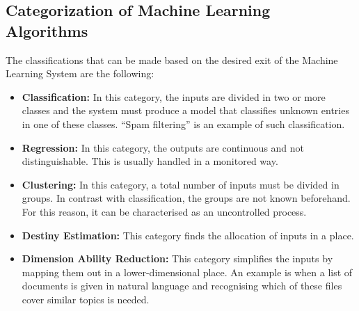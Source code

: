 \subsection{Categorization of Machine Learning Algorithms}\label{211_ref}
The classifications that can be made based on the desired exit of the Machine Learning System are the following:\\
\begin{itemize}

	\item \textbf{Classification:} In this category, the inputs are divided in two or more classes and the system must produce a model that classifies unknown entries in one of these classes. ``Spam filtering'' is an example of such classification.
	\item \textbf{Regression:} In this category, the outputs are continuous and not distinguishable. This is usually handled in a monitored way.
	\item \textbf{Clustering:} In this category, a total number of inputs must be divided in groups. In contrast with classification, the groups are not known beforehand. For this reason, it can be characterised as an uncontrolled process.
	\item \textbf{Destiny Estimation:} This category finds the allocation of inputs in a place.
	\item \textbf{Dimension Ability Reduction:} This category simplifies the inputs by mapping them out in a lower-dimensional place. An example is when a list of documents is given in natural language and recognising which of these files cover similar topics is needed.\\

\end{itemize}

